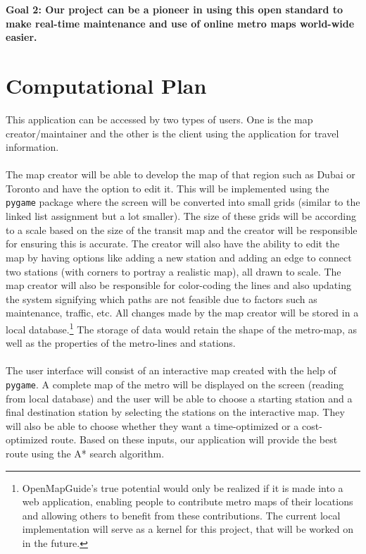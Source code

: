 \documentclass[fontsize=11pt]{article}
\begin{document}
\textbf{Goal 2:
Our project can be a pioneer in using this open standard to make real-time maintenance and use of online metro maps world-wide easier.
}\newline


\section*{Computational Plan}
This application can be accessed by two types of users. One is the map creator/maintainer and the other is the client using the application for travel information.\\
\\
The map creator will be able to develop the map of that region such as Dubai or Toronto and have the option to edit it. This will be implemented using the \texttt{pygame} package where the screen will be converted into small grids (similar to the linked list assignment but a lot smaller). The size of these grids will be according to a scale based on the size of the transit map and the creator will be responsible for ensuring this is accurate. The creator will also have the ability to edit the map by having options like adding a new station and adding an edge to connect two stations (with corners to portray a realistic map), all drawn to scale. The map creator will also be responsible for color-coding the lines and also updating the system signifying which paths are not feasible due to factors such as maintenance, traffic, etc. All changes made by the map creator will be stored in a local database.\footnote{OpenMapGuide's true potential would only be realized if it is made into a web application, enabling people to contribute metro maps of their locations and allowing others to benefit from these contributions. The current local implementation will serve as a kernel for this project, that will be worked on in the future.} The storage of data would retain the shape of the metro-map, as well as the properties of the metro-lines and stations.\\
\\
The user interface will consist of an interactive map created with the help of \texttt{pygame}. A complete map of the metro will be displayed on the screen (reading from local database) and the user will be able to choose a starting station and a final destination station by selecting the stations on the interactive map. They will also be able to choose whether they want a time-optimized or a cost-optimized route. Based on these inputs, our application will provide the best route using the A* search algorithm.\\
\end{document}
